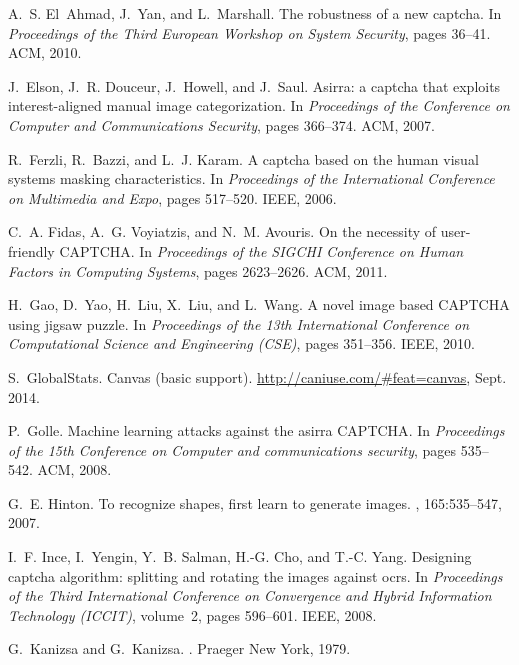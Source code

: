 \documentclass[conference]{IEEEtran}
\begin{document}
\begin{thebibliography}{10}
A.~S. El~Ahmad, J.~Yan, and L.~Marshall.
\newblock The robustness of a new captcha.
\newblock In {\em Proceedings of the Third European Workshop on System
  Security}, pages 36--41. ACM, 2010.

J.~Elson, J.~R. Douceur, J.~Howell, and J.~Saul.
\newblock Asirra: a captcha that exploits interest-aligned manual image
  categorization.
\newblock In {\em Proceedings of the Conference on Computer and Communications
  Security}, pages 366--374. ACM, 2007.

R.~Ferzli, R.~Bazzi, and L.~J. Karam.
\newblock A captcha based on the human visual systems masking characteristics.
\newblock In {\em Proceedings of the International Conference on Multimedia and
  Expo}, pages 517--520. IEEE, 2006.

C.~A. Fidas, A.~G. Voyiatzis, and N.~M. Avouris.
\newblock On the necessity of user-friendly {CAPTCHA}.
\newblock In {\em Proceedings of the SIGCHI Conference on Human Factors in
  Computing Systems}, pages 2623--2626. ACM, 2011.

H.~Gao, D.~Yao, H.~Liu, X.~Liu, and L.~Wang.
\newblock A novel image based {CAPTCHA} using jigsaw puzzle.
\newblock In {\em Proceedings of the 13th International Conference on
  Computational Science and Engineering (CSE)}, pages 351--356. IEEE, 2010.

S.~GlobalStats.
\newblock Canvas (basic support).
\newblock \url{http://caniuse.com/#feat=canvas}, Sept. 2014.

P.~Golle.
\newblock Machine learning attacks against the asirra {CAPTCHA}.
\newblock In {\em Proceedings of the 15th Conference on Computer and
  communications security}, pages 535--542. ACM, 2008.

G.~E. Hinton.
\newblock To recognize shapes, first learn to generate images.
, 165:535--547, 2007.

I.~F. Ince, I.~Yengin, Y.~B. Salman, H.-G. Cho, and T.-C. Yang.
\newblock Designing captcha algorithm: splitting and rotating the images
  against ocrs.
\newblock In {\em Proceedings of the Third International Conference on
  Convergence and Hybrid Information Technology (ICCIT)}, volume~2, pages
  596--601. IEEE, 2008.

G.~Kanizsa and G.~Kanizsa.
.
\newblock Praeger New York, 1979.


\end{thebibliography}
\end{document}
